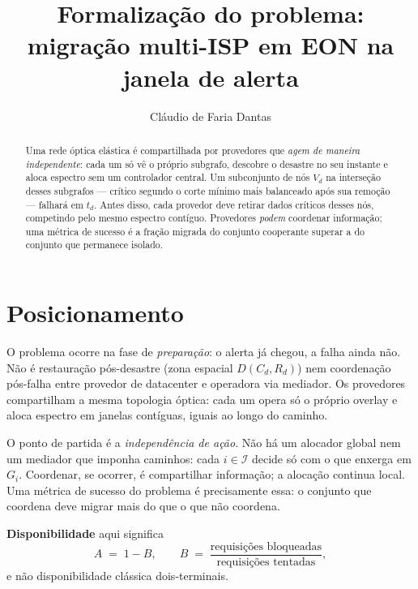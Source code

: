 \documentclass[11pt,a4paper]{article}
\title{Formalização do problema:\\
migração multi-ISP em EON na janela de alerta}
\author{Cláudio de Faria Dantas}
\date{}
\theoremstyle{definition}
\begin{document}
\maketitle

\begin{abstract}
Uma rede óptica elástica é compartilhada por provedores que \emph{agem de maneira independente}: cada um só vê o próprio subgrafo, descobre o desastre no seu instante e aloca espectro sem um controlador central.
Um subconjunto de nós $V_d$ na interseção desses subgrafos --- crítico segundo o corte mínimo mais balanceado após sua remoção --- falhará em $t_d$.
Antes disso, cada provedor deve retirar dados críticos desses nós, competindo pelo mesmo espectro contíguo.
Provedores \emph{podem} coordenar informação; uma métrica de sucesso é a fração migrada do conjunto cooperante superar a do conjunto que permanece isolado.
\end{abstract}

\tableofcontents
\newpage

\section{Posicionamento}

O problema ocorre na fase de \emph{preparação}: o alerta já chegou, a falha ainda não.
Não é restauração pós-desastre (zona espacial $D(C_d,R_d)$) nem coordenação pós-falha entre provedor de datacenter e operadora via mediador.
Os provedores compartilham a mesma topologia óptica: cada um opera só o próprio overlay e aloca espectro em janelas contíguas, iguais ao longo do caminho.

O ponto de partida é a \emph{independência de ação}.
Não há um alocador global nem um mediador que imponha caminhos:
cada $i\in\mathcal{I}$ decide só com o que enxerga em $G_i$.
Coordenar, se ocorrer, é compartilhar informação; a alocação continua local.
Uma métrica de sucesso do problema é precisamente essa: o conjunto que coordena deve migrar mais do que o que não coordena.

\textbf{Disponibilidade} aqui significa
\begin{equation}
  A \;=\; 1 - B,
  \qquad
  B \;=\; \frac{\text{requisições bloqueadas}}{\text{requisições tentadas}},
\end{equation}
e não disponibilidade clássica dois-terminais.
\end{document}
